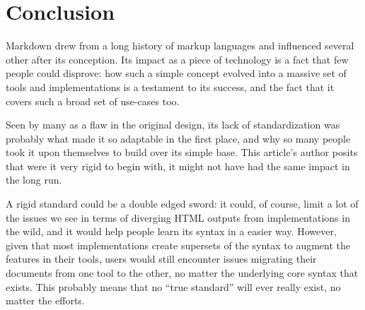 \chapter{Conclusion}
\label{chap:conclusion}

\vspace{1cm}

Markdown drew from a long history of markup languages and influenced several other after its conception. Its impact as a piece of
technology is a fact that few people could disprove: how such a simple concept evolved into a massive set of tools and implementations
is a testament to its success, and the fact that it covers such a broad set of use-cases too.\newline

Seen by many as a flaw in the original design, its lack of standardization was probably what made it so adaptable in the first
place, and why so many people took it upon themselves to build over its simple base. This article's author posits that were it
very rigid to begin with, it might not have had the same impact in the long run.\newline

A rigid standard could be a double edged sword: it could, of course, limit a lot of the issues we see in terms of diverging HTML
outputs from implementations in the wild, and it would help people learn its syntax in a easier way. However, given that most
implementations create supersets of the syntax to augment the features in their tools, users would still encounter issues migrating
their documents from one tool to the other, no matter the underlying core syntax that exists. This probably means that no ``true standard''
will ever really exist, no matter the efforts.